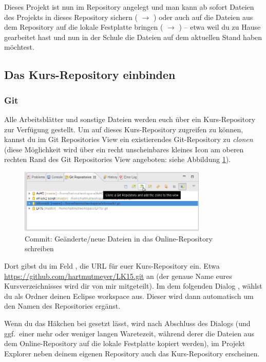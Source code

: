 Dieses Projekt ist nun im Repository angelegt und man kann ab sofort Dateien des
Projekts in dieses Repository sichern ( $\rightarrow$
) oder auch auf die Dateien aus dem Repository auf die
lokale Festplatte bringen ( $\rightarrow$ )
-- etwa weil du zu Hause gearbeitet hast und nun in der Schule die Dateien auf
dem aktuellen Stand haben möchtest.

\subsection{Das Kurs-Repository einbinden}

\subsubsection{Git}

Alle Arbeitsblätter und sonstige Dateien werden euch über ein Kurs-Repository
zur Verfügung gestellt. Um auf dieses Kurs-Repository zugreifen zu können,
kannst du im Git Repositories View ein existierendes Git-Repository zu
\emph{clonen} (diese Möglichkeit wird über ein recht unscheinbares kleines Icon
am oberen rechten Rand des Git Repositories View angeboten: siehe Abbildung
\ref{fig:git-clone}).

\begin{figure}[h]
  \centering
   \includegraphics[width=0.8\textwidth]{./inf/SEKII/01_Vorbereitung/Cloning_a_Git_Repository.png}
   \caption{Commit: Geänderte/neue Dateien in das Online-Repository schreiben}
   \label{fig:git-clone}
\end{figure}

Dort gibst du im Feld , die URL für euer Kurs-Repository ein. Etwa
\url{https://github.com/hartmutmeyer/LK15.git} an (der genaue Name eures
Kursverzeichnisses wird dir von mir mitgeteilt). Im dem folgenden Dialog
, wählst du als Ordner deinen
Eclipse workspace aus. Dieser wird dann automatisch um den Namen des
Repositories ergänst.

Wenn du das Häkchen bei  gesetzt lässt, wird nach Abschluss des Dialogs (und ggf.\ einer mehr
oder weniger langen Waretezeit, während derer die Dateien aus dem
Online-Repository auf die lokale Festplatte kopiert werden), im Projekt Explorer
neben deinem eigenen Repository auch das Kurs-Repository erscheinen.

